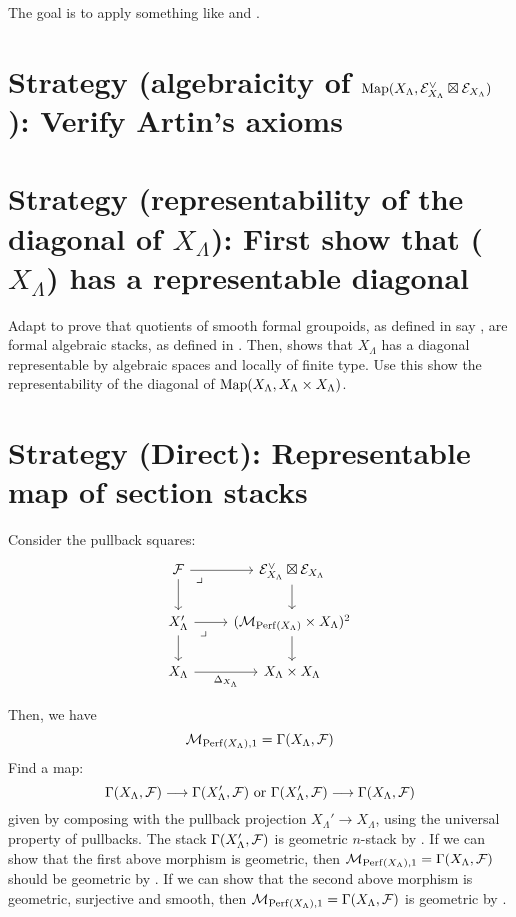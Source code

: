 \documentclass[11pt]{amsart}
\begin{document}
The goal is to apply something like \cite[Lemma 4.23]{Prsntbl-n-St} and
\cite[Theorem 7.2]{AlgGeom-n-St}.

\section{Strategy (algebraicity of
{$\mathrm{Map}(X_\Lambda, \mathcal{E}_{X_\Lambda}^\vee \boxtimes \mathcal{E}_{X_\Lambda})$)}:
Verify Artin's axioms}

\section{Strategy (representability of the diagonal of {$X_\Lambda$}):
First show that ($X_\Lambda$) has a representable diagonal}

Adapt \cite[Theorem 3.4.13]{AlperModuli} to prove that quotients of
smooth formal groupoids, as defined in say \cite[23]{AlgGeom-n-St},
are formal algebraic stacks, as defined in \cite[Definition 5.3.]{FormalAlgSt}.
Then, \cite[Lemma 5.12]{FormalAlgSt} shows that $X_\Lambda$ has a diagonal
representable by algebraic spaces and locally of finite type. Use this
show the representability of the diagonal of
$\mathrm{Map}(X_\Lambda, X_\Lambda \times X_\Lambda)$.

\section{Strategy (Direct): Representable map of section stacks}

Consider the pullback squares:
\[\begin{tikzcd}
\mc{F}
  \ar[r] \ar[d]
  \ar[rd, "\lrcorner" very near start, phantom] &
\mc{E}_{X_\Lambda}^\vee \boxtimes \mc{E}_{X_\Lambda}
  \ar[d] \\
X_\Lambda'
  \ar[r] \ar[d] \ar[rd, "\lrcorner" very near start, phantom] &
(\mc{M}_{\Perf(X_\Lambda)} \times X_\Lambda)^2
  \ar[d] \\
X_\Lambda \ar[r, "\Delta_{X_\Lambda}" below] &
X_\Lambda \times X_\Lambda
\end{tikzcd}\]

Then, we have
\[
\mathcal{M}_{\mathrm{Perf}(X_\Lambda), 1} = \Gamma(X_\Lambda, \mathcal{F})
\]
Find a map:
\[
\Gamma(X_\Lambda, \mc{F}) \to \Gamma(X_\Lambda', \mc{F})
\text{ or } \Gamma(X_\Lambda', \mc{F}) \to \Gamma(X_\Lambda, \mc{F})
\]
given by composing with the pullback projection $X_\Lambda' \to X_\Lambda$,
using the universal property of pullbacks. The stack $\Gamma(X_\Lambda', \mathcal{F})$
is geometric $n$-stack by \cite[Corollary 6.4]{AlgGeom-n-St}. If we can show that the
first above morphism is geometric, then
$\mathcal{M}_{\mathrm{Perf}(X_\Lambda), 1} = \Gamma(X_\Lambda, \mathcal{F})$ should be geometric
by \cite[Corollary 2.6]{AlgGeom-n-St}. If we can show that the second above morphism
is geometric, surjective and smooth, then $\mathcal{M}_{\mathrm{Perf}(X_\Lambda), 1} = \Gamma(X_\Lambda, \mathcal{F})$
is geometric by \cite[Lemma 2.4]{AlgGeom-n-St}.

\printbibliography
\end{document}
